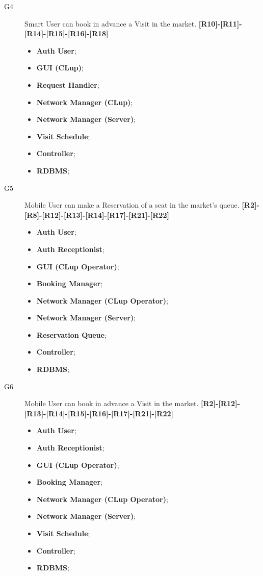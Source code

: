 \begin{description}
    
    \item[G4]Smart User can book in advance a Visit in the market. \textbf{[R10]-[R11]-[R14]-[R15]-[R16]-[R18]}
    \begin{itemize}
        \item \textbf{Auth User};  
        \item \textbf{GUI (CLup)};  
        \item \textbf{Request Handler}; 
        \item \textbf{Network Manager (CLup)}; 
        \item \textbf{Network Manager (Server)};  
        \item \textbf{Visit Schedule};  
        \item \textbf{Controller};
        \item \textbf{RDBMS};
    \end{itemize}
    
    \item[G5]Mobile User can make a Reservation of a seat in the market's queue. \textbf{[R2]-[R8]-[R12]-[R13]-[R14]-[R17]-[R21]-[R22]}
    \begin{itemize}
        \item \textbf{Auth User}; 
        \item \textbf{Auth Receptionist};  
        \item \textbf{GUI (CLup Operator)};  
        \item \textbf{Booking Manager}; 
        \item \textbf{Network Manager (CLup Operator)}; 
        \item \textbf{Network Manager (Server)};  
        \item \textbf{Reservation Queue};  
        \item \textbf{Controller};
        \item \textbf{RDBMS};
    \end{itemize}
    
    \item[G6]Mobile User can book in advance a Visit in the market. \textbf{[R2]-[R12]-[R13]-[R14]-[R15]-[R16]-[R17]-[R21]-[R22]}
     \begin{itemize}
        \item \textbf{Auth User}; 
        \item \textbf{Auth Receptionist};  
        \item \textbf{GUI (CLup Operator)};  
        \item \textbf{Booking Manager}; 
        \item \textbf{Network Manager (CLup Operator)}; 
        \item \textbf{Network Manager (Server)};  
        \item \textbf{Visit Schedule};  
        \item \textbf{Controller};
        \item \textbf{RDBMS};
    \end{itemize}
    

\end{description}
